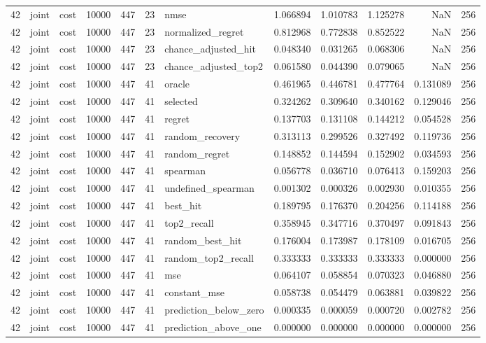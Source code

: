 \begin{tabular}{rllrrrlrrrrr}
42 & joint & cost & 10000 & 447 & 23 & nmse & 1.066894 & 1.010783 & 1.125278 & NaN & 256 \\
42 & joint & cost & 10000 & 447 & 23 & normalized_regret & 0.812968 & 0.772838 & 0.852522 & NaN & 256 \\
42 & joint & cost & 10000 & 447 & 23 & chance_adjusted_hit & 0.048340 & 0.031265 & 0.068306 & NaN & 256 \\
42 & joint & cost & 10000 & 447 & 23 & chance_adjusted_top2 & 0.061580 & 0.044390 & 0.079065 & NaN & 256 \\
42 & joint & cost & 10000 & 447 & 41 & oracle & 0.461965 & 0.446781 & 0.477764 & 0.131089 & 256 \\
42 & joint & cost & 10000 & 447 & 41 & selected & 0.324262 & 0.309640 & 0.340162 & 0.129046 & 256 \\
42 & joint & cost & 10000 & 447 & 41 & regret & 0.137703 & 0.131108 & 0.144212 & 0.054528 & 256 \\
42 & joint & cost & 10000 & 447 & 41 & random_recovery & 0.313113 & 0.299526 & 0.327492 & 0.119736 & 256 \\
42 & joint & cost & 10000 & 447 & 41 & random_regret & 0.148852 & 0.144594 & 0.152902 & 0.034593 & 256 \\
42 & joint & cost & 10000 & 447 & 41 & spearman & 0.056778 & 0.036710 & 0.076413 & 0.159203 & 256 \\
42 & joint & cost & 10000 & 447 & 41 & undefined_spearman & 0.001302 & 0.000326 & 0.002930 & 0.010355 & 256 \\
42 & joint & cost & 10000 & 447 & 41 & best_hit & 0.189795 & 0.176370 & 0.204256 & 0.114188 & 256 \\
42 & joint & cost & 10000 & 447 & 41 & top2_recall & 0.358945 & 0.347716 & 0.370497 & 0.091843 & 256 \\
42 & joint & cost & 10000 & 447 & 41 & random_best_hit & 0.176004 & 0.173987 & 0.178109 & 0.016705 & 256 \\
42 & joint & cost & 10000 & 447 & 41 & random_top2_recall & 0.333333 & 0.333333 & 0.333333 & 0.000000 & 256 \\
42 & joint & cost & 10000 & 447 & 41 & mse & 0.064107 & 0.058854 & 0.070323 & 0.046880 & 256 \\
42 & joint & cost & 10000 & 447 & 41 & constant_mse & 0.058738 & 0.054479 & 0.063881 & 0.039822 & 256 \\
42 & joint & cost & 10000 & 447 & 41 & prediction_below_zero & 0.000335 & 0.000059 & 0.000720 & 0.002782 & 256 \\
42 & joint & cost & 10000 & 447 & 41 & prediction_above_one & 0.000000 & 0.000000 & 0.000000 & 0.000000 & 256 \\

\end{tabular}

